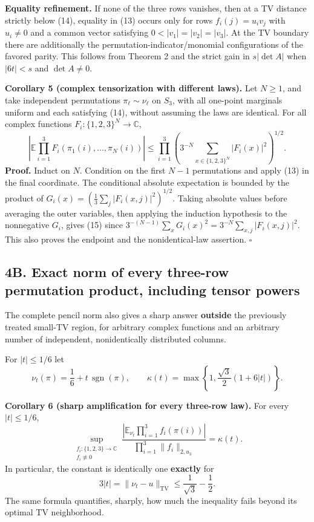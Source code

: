\documentclass[
  11pt,
]{article}
\begin{document}
\textbf{Equality refinement.} If none of the three rows vanishes, then
at a TV distance strictly below (14), equality in (13) occurs only for
rows \(f_i(j)=u_i v_j\) with \(u_i\ne0\) and a common vector satisfying
\(0<|v_1|=|v_2|=|v_3|\). At the TV boundary there are additionally the
permutation-indicator/monomial configurations of the favored parity.
This follows from Theorem 2 and the strict gain in \(s|\det A|\) when
\(|6t|<s\) and \(\det A\ne0\).

\textbf{Corollary 5 (complex tensorization with different laws).} Let
\(N\ge1\), and take independent permutations \(\pi_\ell\sim\nu_\ell\) on
\(S_3\), with all one-point marginals uniform and each satisfying (14),
without assuming the laws are identical. For all complex functions
\(F_i:\{1,2,3\}^N\to\mathbb C\), \[
\left|\mathbb E\prod_{i=1}^3
F_i(\pi_1(i),\dots,\pi_N(i))\right|
\le
\prod_{i=1}^3
\left(3^{-N}\sum_{x\in\{1,2,3\}^N}|F_i(x)|^2\right)^{1/2}.
\tag{15}
\] \textbf{Proof.} Induct on \(N\). Condition on the first \(N-1\)
permutations and apply (13) in the final coordinate. The conditional
absolute expectation is bounded by the product of
\(G_i(x)=(\frac13\sum_j|F_i(x,j)|^2)^{1/2}\). Taking absolute values
before averaging the outer variables, then applying the induction
hypothesis to the nonnegative \(G_i\), gives (15) since
\(3^{-(N-1)}\sum_xG_i(x)^2=3^{-N}\sum_{x,j}|F_i(x,j)|^2\). This also
proves the endpoint and the nonidentical-law assertion. \(\square\)

\subsection{4B. Exact norm of every three-row permutation product,
including tensor
powers}\label{b.-exact-norm-of-every-three-row-permutation-product-including-tensor-powers}

The complete pencil norm also gives a sharp answer \textbf{outside} the
previously treated small-TV region, for arbitrary complex functions and
an arbitrary number of independent, nonidentically distributed columns.

For \(|t|\le1/6\) let \[
\nu_t(\pi)=\frac16+t\,\operatorname{sgn}(\pi),\qquad
\kappa(t)=\max\left\{1,\frac{\sqrt3}{2}(1+6|t|)\right\}.
\tag{30}
\]

\textbf{Corollary 6 (sharp amplification for every three-row law).} For
every \(|t|\le1/6\), \[
\boxed{
\sup_{\substack{f_i:\{1,2,3\}\to\mathbb C\\
                 f_i\not\equiv0}}
\frac{\left|\mathbb E_{\nu_t}\prod_{i=1}^3f_i(\pi(i))\right|}
{\prod_{i=1}^3\|f_i\|_{2,u_3}}
=\kappa(t).}
\tag{31}
\] In particular, the constant is identically one \textbf{exactly} for
\[
3|t|=\|\nu_t-u\|_{\mathrm{TV}}
\le\frac1{\sqrt3}-\frac12.
\] The same formula quantifies, sharply, how much the inequality fails
beyond its optimal TV neighborhood.
\end{document}
